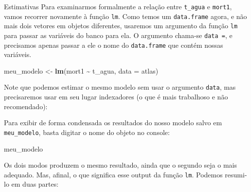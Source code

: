 \documentclass[
  9pt,
  ignorenonframetext,
  aspectratio=169]{beamer}
\newenvironment{Shaded}{\begin{snugshade}}{\end{snugshade}}
\newcommand{\DataTypeTok}[1]{\textcolor[rgb]{0.13,0.29,0.53}{#1}}
\newcommand{\KeywordTok}[1]{\textcolor[rgb]{0.13,0.29,0.53}{\textbf{#1}}}
\newcommand{\NormalTok}[1]{#1}
\newcommand{\OperatorTok}[1]{\textcolor[rgb]{0.81,0.36,0.00}{\textbf{#1}}}
\newcommand{\StringTok}[1]{\textcolor[rgb]{0.31,0.60,0.02}{#1}}
\begin{document}
\begin{frame}[fragile]{Estimativas}
\protect\hypertarget{estimativas}{}
Para examinarmos formalmente a relação entre \texttt{t\_agua} e
\texttt{mort1}, vamos recorrer novamente à função \texttt{lm}. Como
temos um \texttt{data.frame} agora, e não mais dois vetores em objetos
diferentes, usaremos um argumento da função \texttt{lm} para passar as
variáveis do banco para ela. O argumento chama-se \texttt{data\ =}, e
precisamos apenas passar a ele o nome do \texttt{data.frame} que contém
nossas variáveis.

\begin{Shaded}
\begin{Highlighting}[]
\NormalTok{meu\_modelo \textless{}{-}}\StringTok{ }\KeywordTok{lm}\NormalTok{(mort1 }\OperatorTok{\textasciitilde{}}\StringTok{ }\NormalTok{t\_agua, }\DataTypeTok{data =}\NormalTok{ atlas)}
\end{Highlighting}
\end{Shaded}

Note que podemos estimar o mesmo modelo sem usar o argumento
\texttt{data}, mas precisaremos usar em seu lugar indexadores (o que é
mais trabalhoso e não recomendado):

\begin{Shaded}
\end{Shaded}

Para exibir de forma condensada os resultados do nosso modelo salvo em
\texttt{meu\_modelo}, basta digitar o nome do objeto no console:

\begin{Shaded}
\begin{Highlighting}[]
\NormalTok{meu\_modelo}
\end{Highlighting}
\end{Shaded}

Os dois modos produzem o mesmo resultado, ainda que o segundo seja o
mais adequado. Mas, afinal, o que significa esse output da função
\texttt{lm}. Podemos resumi-lo em duas partes:


\end{frame}
\end{document}
